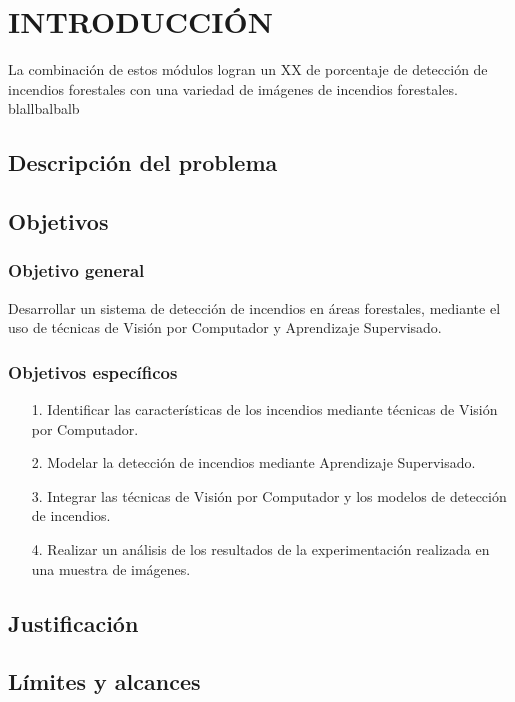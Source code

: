\chapter{INTRODUCCIÓN}


\noindent La combinación de estos módulos logran un XX de porcentaje de detección de incendios forestales con una variedad de imágenes de incendios forestales. blallbalbalb

\section{Descripción del problema}

\section{Objetivos}

\subsection{Objetivo general}
\noindent Desarrollar un sistema de detección de incendios en áreas forestales, mediante el uso de técnicas de Visión por Computador y Aprendizaje Supervisado.

\subsection{Objetivos específicos}

\begin{itemize}
\item[1.] Identificar las características de los incendios mediante técnicas de Visión por Computador.
\item[2.] Modelar la detección de incendios mediante Aprendizaje Supervisado.
\item[3.] Integrar las técnicas de Visión por Computador y los modelos de detección de incendios.
\item[4.] Realizar un análisis de los resultados de la experimentación realizada en una muestra de imágenes.
\end{itemize}

\section{Justificación}

\section{Límites y alcances}

